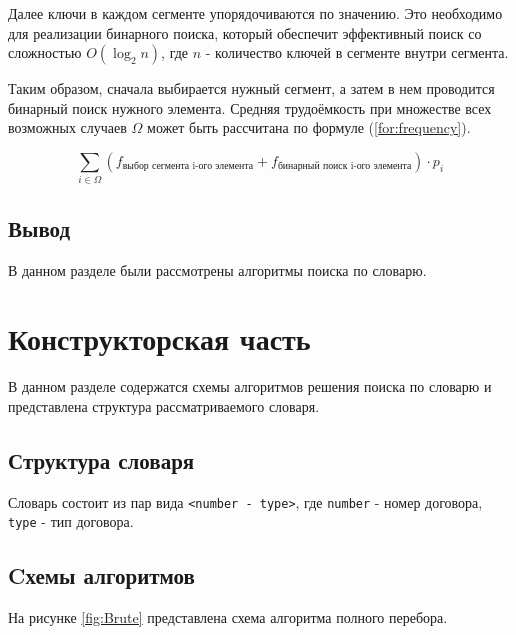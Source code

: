 \documentclass[12pt]{report}
\begin{document}
Далее ключи в каждом сегменте упорядочиваются по значению. Это необходимо для реализации бинарного поиска, который обеспечит эффективный поиск со сложностью $O(\log_2n)$, где $n$ - количество ключей в сегменте внутри сегмента.

Таким образом, сначала выбирается нужный сегмент, а затем в нем проводится бинарный поиск нужного элемента. Средняя трудоёмкость при множестве всех возможных случаев $\Omega$ может быть рассчитана по формуле (\ref{for:frequency}). 

\begin{equation}
	\label{for:frequency}
	\sum_{i \in \Omega}{\left(f_{\text{выбор сегмента i-ого элемента}} + f_{\text{бинарный поиск i-ого элемента}}\right)} \cdot p_i
\end{equation}


\section{Вывод}
В данном разделе были рассмотрены алгоритмы поиска по словарю.


\chapter{Конструкторская часть}
В данном разделе содержатся схемы алгоритмов решения поиска по словарю и представлена структура рассматриваемого словаря.

\section{Структура словаря}

Словарь состоит из пар вида \texttt{<number - type>}, где \texttt{number} - номер договора, \texttt{type} - тип договора.

\section{Cхемы алгоритмов}

На рисунке \ref{fig:Brute} представлена схема алгоритма полного перебора.
\end{document}
